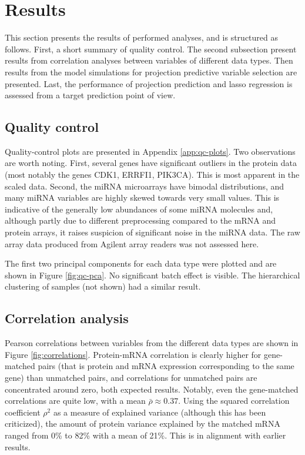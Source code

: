 
\section{Results}

This section presents the results of performed analyses, and is structured as
follows. First, a short summary of quality control. The second subsection
present results from correlation analyses between variables of different data
types. Then results from the model simulations for projection predictive
variable selection are presented. Last, the performance of projection
prediction and lasso regression is assessed from a target prediction point of
view.




\subsection{Quality control}

Quality-control plots are presented in Appendix \ref{app:qc-plots}. Two
observations are worth noting. First, several genes have significant outliers
in the protein data (most notably the genes CDK1, ERRFI1, PIK3CA). This is
most apparent in the scaled data. Second, the miRNA microarrays have bimodal
distributions, and many miRNA variables are highly skewed towards very small
values. This is indicative of the generally low abundances of some miRNA molecules
and, although partly due to different preprocessing compared to the mRNA and
protein arrays, it raises suspicion of significant noise in the miRNA data.
The raw array data produced from Agilent array readers was not assessed here.

The first two principal components for each data type were plotted and are
shown in Figure \ref{fig:qc-pca}. No significant batch effect is visible. The
hierarchical clustering of samples (not shown) had a similar result.




\subsection{Correlation analysis}

Pearson correlations between variables from the different data types are shown in Figure
\ref{fig:correlations}. Protein-mRNA correlation is clearly higher for gene-matched pairs
(that is protein and mRNA expression corresponding to the same gene) than unmatched pairs,
and correlations for unmatched pairs are concentrated around zero, both expected
results. Notably, even the gene-matched correlations are quite low, with a
mean $\bar{\rho} \approx 0.37$. Using the squared correlation coefficient $\rho^2$ as a
measure of explained variance (although this has been criticized), the amount
of protein variance explained by the matched mRNA ranged from 0\% to 82\% with a mean of
21\%. This is in alignment with earlier results.

